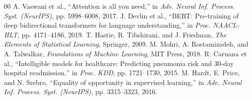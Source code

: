 \documentclass[conference]{IEEEtran}
\begin{document}
\begin{thebibliography}{00}
 A. Vaswani et al., ``Attention is all you need,'' in \textit{Adv. Neural Inf. Process. Syst. (NeurIPS)}, pp. 5998--6008, 2017.
 J. Devlin et al., ``BERT: Pre-training of deep bidirectional transformers for language understanding,'' in \textit{Proc. NAACL-HLT}, pp. 4171--4186, 2019.
 T. Hastie, R. Tibshirani, and J. Friedman, \textit{The Elements of Statistical Learning}, Springer, 2009.
 M. Mohri, A. Rostamizadeh, and A. Talwalkar, \textit{Foundations of Machine Learning}, MIT Press, 2018.
 R. Caruana et al., ``Intelligible models for healthcare: Predicting pneumonia risk and 30-day hospital readmission,'' in \textit{Proc. KDD}, pp. 1721--1730, 2015.
 M. Hardt, E. Price, and N. Srebro, ``Equality of opportunity in supervised learning,'' in \textit{Adv. Neural Inf. Process. Syst. (NeurIPS)}, pp. 3315--3323, 2016.
\end{thebibliography}
\end{document}
